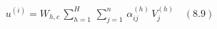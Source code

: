 \documentclass[preview]{standalone}
\begin{document}
\begin{align*}
u^{(i)} = W_{h,c}\,\sum_{h=1}^{H}\,\sum_{j=1}^{n}\,\alpha_{ij}^{(h)}\,V_j^{(h)}\quad (8.9)
\end{align*}
\end{document}
